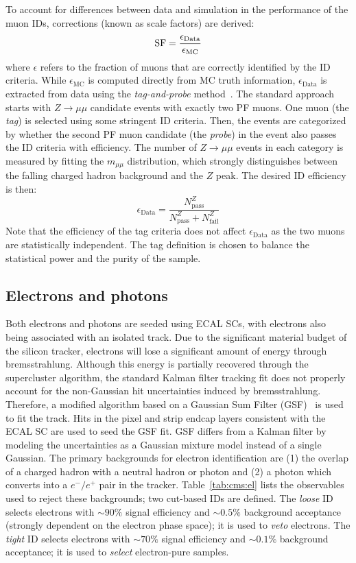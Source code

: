 To account for differences between data and simulation in the performance of the muon IDs, corrections (known as scale factors) are derived:
\begin{equation}
    \mathrm{SF} = \frac{\epsilon_\mathrm{Data}}{\epsilon_\mathrm{MC}}
\end{equation}
where $\epsilon$ refers to the fraction of muons that are correctly identified by the ID criteria.
While $\epsilon_\mathrm{MC}$ is computed directly from MC truth information, $\epsilon_\mathrm{Data}$ is extracted from data using the \emph{tag-and-probe} method~\cite{cmstnp}.
The standard approach starts with $Z\rightarrow\mu\mu$ candidate events with exactly two PF muons.
One muon (the \emph{tag}) is selected using some stringent ID criteria.
Then, the events are categorized by whether the second PF muon candidate (the \emph{probe})  in the event also passes the ID criteria with efficiency.
The number of $Z\rightarrow\mu\mu$ events in each category is measured by fitting the $m_{\mu\mu}$ distribution, which strongly distinguishes between the falling charged hadron background and the $Z$ peak.
The desired ID efficiency is then:
\begin{equation}
	\epsilon_\mathrm{Data} = \frac{N_\mathrm{pass}^{Z}}{N_\mathrm{pass}^Z + N_\mathrm{fail}^Z}
\end{equation}
Note that the efficiency of the tag criteria does not affect $\epsilon_\mathrm{Data}$ as the two muons are statistically independent.
The tag definition is chosen to balance the statistical power and the purity of the sample.

\subsection{Electrons and photons}

Both electrons and photons are seeded using ECAL SCs, with electrons also being associated with an isolated track.
Due to the significant material budget of the silicon tracker, electrons will lose a significant amount of energy through bremsstrahlung.
Although this energy is partially recovered through the supercluster algorithm, the standard Kalman filter tracking fit does not properly account for the non-Gaussian hit uncertainties induced by bremsstrahlung.
Therefore, a modified algorithm based on a Gaussian Sum Filter (GSF)~\cite{cmstracker,gsf} is used to fit the track.
Hits in the pixel and strip endcap layers consistent with the ECAL SC are used to seed the GSF fit.
GSF differs from a Kalman filter by modeling the uncertainties as a Gaussian mixture model instead of a single Gaussian.
The primary backgrounds for electron identification are (1) the overlap of a charged hadron with a neutral hadron or photon and (2) a photon which converts into a $e^-/e^+$ pair in the tracker.
Table~\ref{tab:cms:el} lists the observables used to reject these backgrounds; two cut-based IDs are defined.
The \emph{loose} ID selects electrons with $\sim90\%$ signal efficiency and $\sim0.5\%$ background acceptance (strongly dependent on the electron phase space); it is used to \emph{veto} electrons. 
The \emph{tight} ID selects electrons with $\sim70\%$ signal efficiency and $\sim0.1\%$ background acceptance; it is used to \emph{select} electron-pure samples. 

